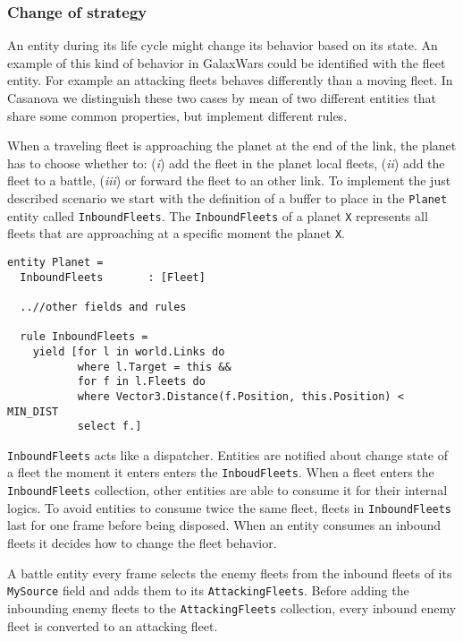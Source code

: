 \subsubsection{Change of strategy}
An entity during its life cycle might change its behavior based on its state. An example of this kind of behavior in GalaxWars could be identified with the fleet entity. For example an attacking fleets behaves differently than a moving fleet. In Casanova we distinguish these two cases by mean of two different entities that share some common properties, but implement different rules.

When a traveling fleet is approaching the planet at the end of the link, the planet has to choose whether to: (\textit{i}) add the fleet in the planet local fleets, (\textit{ii}) add the fleet to a battle, (\textit{iii}) or forward the fleet to an other link. To implement the just described scenario we start with the definition of a buffer to place in the \texttt{Planet} entity called \texttt{InboundFleets}. The \texttt{InboundFleets} of a planet \texttt{X} represents all fleets that are approaching at a specific moment the planet \texttt{X}. 

\begin{lstlisting}
entity Planet =  
  InboundFleets       : [Fleet]
  
  ..//other fields and rules
  
  rule InboundFleets =
    yield [for l in world.Links do           
           where l.Target = this &&
           for f in l.Fleets do
           where Vector3.Distance(f.Position, this.Position) < MIN_DIST
           select f.]

\end{lstlisting}

\texttt{InboundFleets} acts like a dispatcher. Entities are notified about change state of a fleet the moment it enters enters the \texttt{InboudFleets}. When a fleet enters the \texttt{InboundFleets} collection, other entities are able to consume it for their internal logics. To avoid entities to consume twice the same fleet, fleets in \texttt{InboundFleets} last for one frame before being disposed. When an entity consumes an inbound fleets it decides how to change the fleet behavior. 

\noindent
A battle entity every frame selects the enemy fleets from the inbound fleets of its \texttt{MySource} field and adds them to its \texttt{AttackingFleets}. Before adding the inbounding enemy fleets to the \texttt{AttackingFleets} collection, every inbound enemy fleet is converted to an attacking fleet.

